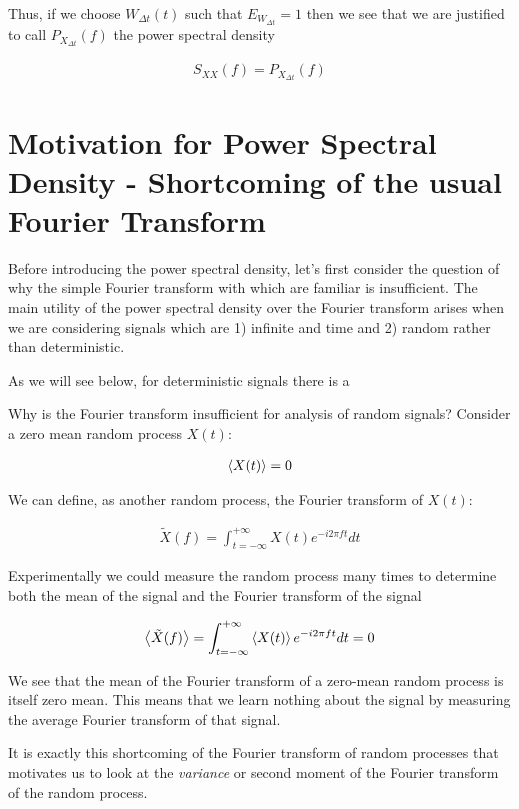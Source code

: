 \documentclass[12pt]{article}
\begin{document}
Thus, if we choose $W_{\Delta t}(t)$ such that $E_{W_{\Delta t}} = 1$ then we see that we are justified to call $P_{X_{\Delta t}}(f)$ the power spectral density

\begin{align}
S_{XX}(f) = P_{X_{\Delta t}}(f)
\end{align}

\section{Motivation for Power Spectral Density - Shortcoming of the usual Fourier Transform}

Before introducing the power spectral density, let's first consider the question of why the simple Fourier transform with which are familiar is insufficient.
The main utility of the power spectral density over the Fourier transform arises when we are considering signals which are 1) infinite and time and 2) random rather than deterministic.



As we will see below, for deterministic signals there is a 

Why is the Fourier transform insufficient for analysis of random signals?
Consider a zero mean random process $X(t)$:

\begin{align}
\Braket{X(t)} = 0
\end{align}

We can define, as another random process, the Fourier transform of $X(t)$:

\begin{align}
\tilde{X}(f) = \int_{t=-\infty}^{+\infty} X(t) e^{-i2\pi f t} dt
\end{align}

Experimentally we could measure the random process many times to determine both the mean of the signal and the Fourier transform of the signal

\begin{align}
\Braket{\tilde{X}(f)} = \int_{t=-\infty}^{+\infty} \Braket{X(t)} e^{-i2\pi f t} dt = 0
\end{align}

We see that the mean of the Fourier transform of a zero-mean random process is itself zero mean. This means that we learn nothing about the signal by measuring the average Fourier transform of that signal.

It is exactly this shortcoming of the Fourier transform of random processes that motivates us to look at the \textit{variance} or second moment of the Fourier transform of the random process.
\end{document}
